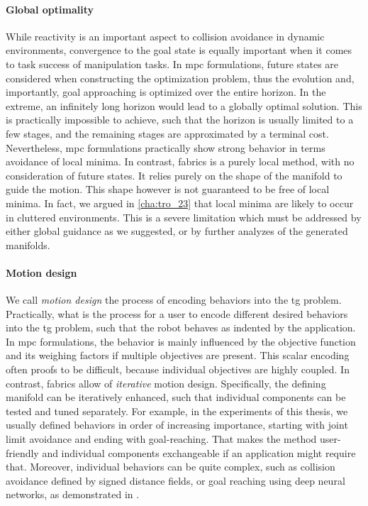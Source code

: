 \paragraph{Global optimality}
\label{par:discussion_global_optimiality}

While reactivity is an important aspect to collision
avoidance in dynamic environments, convergence to the goal
state is equally important when it comes to task success of
manipulation tasks. In \ac{mpc} formulations, future states
are considered when constructing the optimization problem,
thus the evolution and, importantly, goal approaching is
optimized over the entire horizon. In the extreme, an
infinitely long horizon would lead to a globally optimal
solution. This is practically impossible to achieve, such
that the horizon is usually limited to a few stages, and the
remaining stages are approximated by a terminal cost.
Nevertheless, \ac{mpc} formulations practically show strong 
behavior in terms avoidance of local minima. In contrast,
\ac{fabrics} is a purely local method, with no consideration
of future states. It relies purely on the shape of the
manifold to guide the motion. This shape however is not
guaranteed to be free of local minima. In fact, we argued in 
\cref{cha:tro_23} that local minima are likely to occur in
cluttered environments. This is a severe limitation which
must be addressed by either global guidance as we suggested,
or by further analyzes of the generated manifolds.

\paragraph{Motion design}
\label{par:motion_design}

We call \textit{motion design} the process of encoding
behaviors into the \ac{tg} problem. Practically, what is the
process for a user to encode different desired behaviors
into the \ac{tg} problem, such that the robot behaves as
indented by the application. In \ac{mpc} formulations,
the behavior is mainly influenced by the objective function
and its weighing factors if multiple objectives are present.
This scalar encoding often proofs to be difficult, because
individual objectives are highly coupled. In contrast,
\ac{fabrics} allow of \textit{iterative} motion design.
Specifically, the defining manifold can be iteratively
enhanced, such that individual components can be tested and
tuned separately. For example, in the experiments of this
thesis, we usually defined behaviors in order of
increasing importance, starting with joint limit avoidance
and ending with goal-reaching. That makes the method
user-friendly and individual components exchangeable if an
application might require that. Moreover, individual
behaviors can be quite complex, such as collision avoidance
defined by signed distance fields, or goal reaching using
deep neural networks, as demonstrated in \cite{xie2023neural}.

